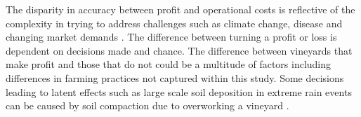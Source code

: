 \documentclass[review,12pt,authoryear]{elsarticle}
\begin{document}
\begin{linenumbers}








The disparity in accuracy between profit and operational costs is reflective of the complexity in trying to address challenges such as climate change, disease and changing market demands \citep{wineaustraliaNationalVintageReport2020,wineaustraliaNationalVintageReport2021,wineaustraliaNationalVintageReport2022}. The difference between turning a profit or loss is dependent on decisions made and chance. The difference between vineyards that make profit and those that do not could be a multitude of factors including differences in farming practices not captured within this study. Some decisions leading to latent effects such as large scale soil deposition in extreme rain events can be caused by soil compaction due to overworking a vineyard \citep{capelloPermanentCoverSoil2020}. 

\iffalse




\end{linenumbers}
\end{document}

